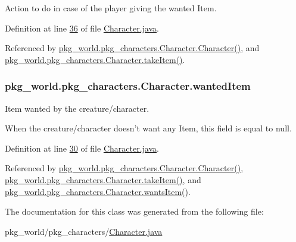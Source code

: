 Action to do in case of the player giving the wanted Item. 



Definition at line \hyperlink{Character_8java_source_l00036}{36} of file \hyperlink{Character_8java_source}{Character.\-java}.



Referenced by \hyperlink{Character_8java_source_l00081}{pkg\-\_\-world.\-pkg\-\_\-characters.\-Character.\-Character()}, and \hyperlink{Character_8java_source_l00108}{pkg\-\_\-world.\-pkg\-\_\-characters.\-Character.\-take\-Item()}.

\hypertarget{classpkg__world_1_1pkg__characters_1_1Character_a3e5abf14759d18446163db9597d10a44}{
\subsubsection[{wanted\-Item}]{ pkg\-\_\-world.\-pkg\-\_\-characters.\-Character.\-wanted\-Item\hspace{0.3cm}{\ttfamily [private]}}}\label{classpkg__world_1_1pkg__characters_1_1Character_a3e5abf14759d18446163db9597d10a44}


Item wanted by the creature/character. 

When the creature/character doesn't want any Item, this field is equal to null. 

Definition at line \hyperlink{Character_8java_source_l00030}{30} of file \hyperlink{Character_8java_source}{Character.\-java}.



Referenced by \hyperlink{Character_8java_source_l00081}{pkg\-\_\-world.\-pkg\-\_\-characters.\-Character.\-Character()}, \hyperlink{Character_8java_source_l00108}{pkg\-\_\-world.\-pkg\-\_\-characters.\-Character.\-take\-Item()}, and \hyperlink{Character_8java_source_l00119}{pkg\-\_\-world.\-pkg\-\_\-characters.\-Character.\-wants\-Item()}.



The documentation for this class was generated from the following file\-:\begin{DoxyCompactItemize}
\item 
pkg\-\_\-world/pkg\-\_\-characters/\hyperlink{Character_8java}{Character.\-java}\end{DoxyCompactItemize}
